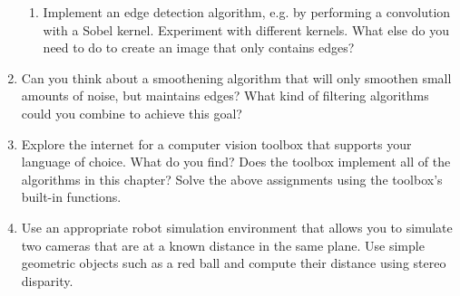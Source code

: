 \begin{enumerate}
\begin{enumerate}
\item Implement an edge detection algorithm, e.g. by performing a convolution with a Sobel kernel. Experiment with different kernels. What else do you need to do to create an image that only contains edges?
\end{enumerate}
\item Can you think about a smoothening algorithm that will only smoothen small amounts of noise, but maintains edges? What kind of filtering algorithms could you combine to achieve this goal?
\item Explore the internet for a computer vision toolbox that supports your language of choice. What do you find? Does the toolbox implement all of the algorithms in this chapter? Solve the above assignments using the toolbox's built-in functions.
\item Use an appropriate robot simulation environment that allows you to simulate two cameras that are at a known distance in the same plane. Use simple geometric objects such as a red ball and compute their distance using stereo disparity. 
\end{enumerate} \normalsize
